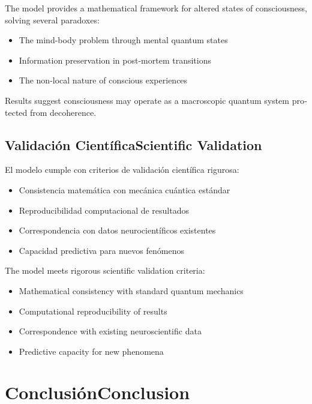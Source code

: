 \documentclass[12pt,a4paper]{article}
\newcommand{\es}[1]{\foreignlanguage{spanish}{#1}}
\newcommand{\en}[1]{\foreignlanguage{english}{#1}}
\begin{document}
\begin{otherlanguage}{english}
The model provides a mathematical framework for altered states of consciousness, solving several paradoxes:
\begin{itemize}
\item The mind-body problem through mental quantum states
\item Information preservation in post-mortem transitions
\item The non-local nature of conscious experiences
\end{itemize}

Results suggest consciousness may operate as a macroscopic quantum system protected from decoherence.
\end{otherlanguage}

\subsection{\es{Validación Científica}\en{Scientific Validation}}

\begin{otherlanguage}{spanish}
El modelo cumple con criterios de validación científica rigurosa: \cite{tegmark2000, fisher2015}
\begin{itemize}
\item Consistencia matemática con mecánica cuántica estándar
\item Reproducibilidad computacional de resultados
\item Correspondencia con datos neurocientíficos existentes
\item Capacidad predictiva para nuevos fenómenos
\end{itemize}
\end{otherlanguage}

\begin{otherlanguage}{english}
The model meets rigorous scientific validation criteria: \cite{tegmark2000, fisher2015}
\begin{itemize}
\item Mathematical consistency with standard quantum mechanics
\item Computational reproducibility of results
\item Correspondence with existing neuroscientific data
\item Predictive capacity for new phenomena
\end{itemize}
\end{otherlanguage}

\section{\es{Conclusión}\en{Conclusion}}
\end{document}
